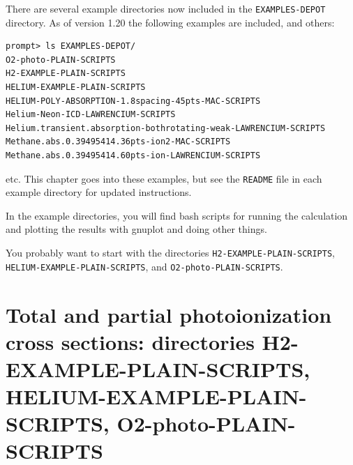 \documentclass[10pt,leqno, oneside]{book}
\begin{document}
There are several example directories now included in the \verb#EXAMPLES-DEPOT# directory.  As of version 1.20 the following examples
are included, and others:

{\footnotesize
\begin{verbatim}
prompt> ls EXAMPLES-DEPOT/
O2-photo-PLAIN-SCRIPTS
H2-EXAMPLE-PLAIN-SCRIPTS
HELIUM-EXAMPLE-PLAIN-SCRIPTS
HELIUM-POLY-ABSORPTION-1.8spacing-45pts-MAC-SCRIPTS
Helium-Neon-ICD-LAWRENCIUM-SCRIPTS
Helium.transient.absorption-bothrotating-weak-LAWRENCIUM-SCRIPTS
Methane.abs.0.39495414.36pts-ion2-MAC-SCRIPTS
Methane.abs.0.39495414.60pts-ion-LAWRENCIUM-SCRIPTS
\end{verbatim}
}

etc.  This chapter goes into these examples, but see the \verb#README# file in each example directory for updated instructions.  

In the example directories, you will find bash scripts for running the calculation and plotting the results with gnuplot and doing other things.

You probably want to start with the directories \verb#H2-EXAMPLE-PLAIN-SCRIPTS#, \verb#HELIUM-EXAMPLE-PLAIN-SCRIPTS#, and
\verb#O2-photo-PLAIN-SCRIPTS#.

\section{Total and partial photoionization cross sections: directories H2-EXAMPLE-PLAIN-SCRIPTS, HELIUM-EXAMPLE-PLAIN-SCRIPTS, O2-photo-PLAIN-SCRIPTS }
\end{document}
